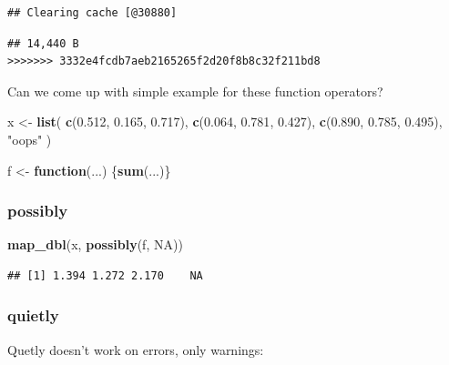 \documentclass[]{book}
\newenvironment{Shaded}{\begin{snugshade}}{\end{snugshade}}
\newcommand{\ControlFlowTok}[1]{\textcolor[rgb]{0.13,0.29,0.53}{\textbf{#1}}}
\newcommand{\FloatTok}[1]{\textcolor[rgb]{0.00,0.00,0.81}{#1}}
\newcommand{\KeywordTok}[1]{\textcolor[rgb]{0.13,0.29,0.53}{\textbf{#1}}}
\newcommand{\NormalTok}[1]{#1}
\newcommand{\OtherTok}[1]{\textcolor[rgb]{0.56,0.35,0.01}{#1}}
\newcommand{\StringTok}[1]{\textcolor[rgb]{0.31,0.60,0.02}{#1}}
\begin{document}
\begin{verbatim}
## Clearing cache [@30880]
\end{verbatim}

\begin{verbatim}
## 14,440 B
>>>>>>> 3332e4fcdb7aeb2165265f2d20f8b8c32f211bd8
\end{verbatim}

Can we come up with simple example for these function operators?

\begin{Shaded}
\begin{Highlighting}[]
\NormalTok{x <-}\StringTok{ }\KeywordTok{list}\NormalTok{(}
  \KeywordTok{c}\NormalTok{(}\FloatTok{0.512}\NormalTok{, }\FloatTok{0.165}\NormalTok{, }\FloatTok{0.717}\NormalTok{),}
  \KeywordTok{c}\NormalTok{(}\FloatTok{0.064}\NormalTok{, }\FloatTok{0.781}\NormalTok{, }\FloatTok{0.427}\NormalTok{),}
  \KeywordTok{c}\NormalTok{(}\FloatTok{0.890}\NormalTok{, }\FloatTok{0.785}\NormalTok{, }\FloatTok{0.495}\NormalTok{),}
  \StringTok{"oops"}
\NormalTok{)}

\NormalTok{f <-}\StringTok{ }\ControlFlowTok{function}\NormalTok{(...) \{}\KeywordTok{sum}\NormalTok{(...)\}}
\end{Highlighting}
\end{Shaded}

\hypertarget{possibly}{%
\subsubsection*{possibly}\label{possibly}}

\begin{Shaded}
\begin{Highlighting}[]
\KeywordTok{map_dbl}\NormalTok{(x, }\KeywordTok{possibly}\NormalTok{(f, }\OtherTok{NA}\NormalTok{))}
\end{Highlighting}
\end{Shaded}

\begin{verbatim}
## [1] 1.394 1.272 2.170    NA
\end{verbatim}

\hypertarget{quietly}{%
\subsubsection*{quietly}\label{quietly}}

Quetly doesn't work on errors, only warnings:
\end{document}
